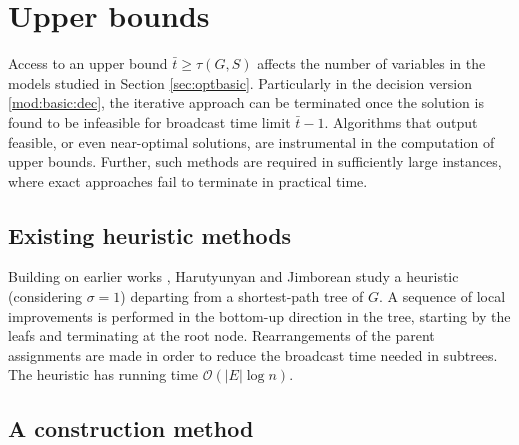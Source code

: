\section{Upper bounds} \label{sec:ub}

Access to an upper bound $\bar{t}\geq\tau(G,S)$ affects the number of variables in the models studied in Section \ref{sec:optbasic}. 
Particularly in the decision version \eqref{mod:basic:dec},
the iterative approach can be terminated once the solution is found to be infeasible for broadcast time limit $\bar{t}-1$.
Algorithms that output feasible, or even near-optimal solutions, are instrumental in the computation of upper bounds.
Further, such methods are required in sufficiently large instances, where exact approaches fail to terminate in practical time.

\subsection{Existing heuristic methods} \label{sec:heur}

Building on earlier works \cite{harutyunyan06, harutyunyan10},
Harutyunyan and Jimborean \cite{harutyunyan14} study a heuristic (considering $\sigma=1$) departing from a shortest-path tree of $G$.
A sequence of local improvements is performed in the bottom-up direction in the tree, starting by the leafs and terminating at the root node.
Rearrangements of the parent assignments are made in order to reduce the broadcast time needed in subtrees.
The heuristic has running time $\mathcal{O}\left(|E|\log{n}\right)$.

\subsection{A construction method} \label{sec:cons}

